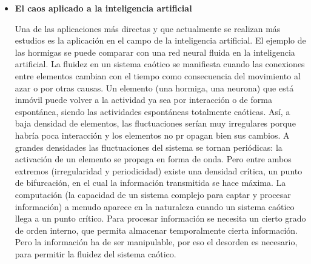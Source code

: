 \documentclass[letterpaper, 11pt, oneside]{article}
\theoremstyle{definition}
\theoremstyle{remark}
\begin{document}
\begin{itemize}
{\bf La macroevolución: } El proceso evolutivo se puede representar en forma de árbol, cuya estructura dendriforme es fractal. Las regularidades que aparecen entre grupos taxonómicos revelan la existencia de leyes invariantes a cualquier escala taxonómica, propiedad típica de los fractales.
El 99,99\% de las formas vivientes que han aparecido sobre la Tierra se han extinguido. 
Si la adaptación confiere ventaja a la especie, cabe presumir que los grupos más persistentes serán los menos propensos a desaparecer. Pero el estudio de los patrones de extinción nos dice que la probabilidad de extinción de un grupo cualquiera se muestra constante a lo largo del tiempo y no depende de cuánto llevara existiendo en el planeta.
En su teoría, Van Valen considera que cada especie intenta mejorar su posición dentro del ecosistema: además de interaccionar con el medio físico también interacciona con el ambiente biótico. Un cambio en la situación de una especie induce a cambios en las demás, cuya alteración influirá, a su vez, en la primera, y así en idas y venidas sin fin. Así el sistema evoluciona hacia un punto crítico donde se aprecia que ciertas partes del sistema permanecen inalteradas durante largo tiempo, mientras que otras se modifican con rapidez. 
La especie cambia sólo para persistir: la selección natural no mejora la adaptación de la especie: sólo la mantiene. Las especies incapaces de cambiar se extinguen.

\item {\bf El caos aplicado a la inteligencia artificial \par}

Una de las aplicaciones más directas y que actualmente se realizan más estudios es la aplicación en el campo de la inteligencia artificial. El ejemplo de las hormigas se puede comparar con una red neural fluida en la inteligencia artificial. La fluidez en un sistema caótico se manifiesta cuando las conexiones entre elementos cambian con el tiempo como consecuencia del movimiento al azar o por otras causas. Un elemento (una hormiga, una neurona) que está inmóvil puede volver a la actividad ya sea por interacción o de forma espontánea, siendo las actividades espontáneas totalmente caóticas. Así, a baja densidad de elementos, las fluctuaciones serían muy irregulares porque habría poca interacción y los elementos no pr opagan bien sus cambios. A grandes densidades las fluctuaciones del sistema se tornan periódicas: la activación de un elemento se propaga en forma de onda. Pero entre ambos extremos (irregularidad y periodicidad) existe una densidad crítica, un punto de bifurcación, en el cual la información transmitida se hace máxima. La computación (la capacidad de un sistema complejo para captar y procesar información) a menudo aparece en la naturaleza cuando un sistema caótico llega a un punto crítico. Para procesar información se necesita un cierto grado de orden interno, que permita almacenar temporalmente cierta información. Pero la información ha de ser manipulable, por eso el desorden es necesario, para permitir la fluidez del sistema caótico.


\end{itemize}
\end{document}
